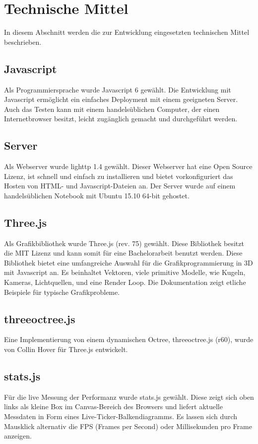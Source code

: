 \documentclass[draft=false
              ,paper=a4
              ,twoside=false
              ,fontsize=11pt
              ,headsepline
              ,BCOR10mm
              ,DIV11
              ,bibtotoc
              ,liststotoc
              ]{scrbook}
\begin{document}
\section{Technische Mittel}
In diesem Abschnitt werden die zur Entwicklung eingesetzten technischen Mittel beschrieben.
\subsection{Javascript}
Als Programmiersprache wurde Javascript 6 gewählt. Die Entwicklung mit Javascript ermöglicht ein einfaches Deployment mit einem geeigneten Server. Auch das Testen kann mit einem handelsüblichen Computer, der einen Internetbrowser besitzt, leicht zugänglich gemacht und durchgeführt werden.
\subsection{Server}
Als Webserver wurde lighttp 1.4 gewählt. Dieser Webserver hat eine Open Source Lizenz, ist schnell und einfach zu installieren und bietet vorkonfiguriert das Hosten von HTML- und Javascript-Dateien an. Der Server wurde auf einem handelsüblichen Notebook mit Ubuntu 15.10 64-bit gehostet.
\subsection{Three.js}
Als Grafikbibliothek wurde Three.js (rev. 75) gewählt. Diese Bibliothek besitzt die MIT Lizenz und kann somit für eine Bachelorarbeit benutzt werden. Diese Bibliothek bietet eine umfangreiche Auswahl für die Grafikprogrammierung in 3D mit Javascript an. Es beinhaltet Vektoren, viele primitive Modelle, wie Kugeln, Kameras, Lichtquellen, und eine Render Loop. Die Dokumentation zeigt etliche Beispiele für typische Grafikprobleme.
\subsection{threeoctree.js}
Eine Implementierung von einem dynamischen Octree, threeoctree.js (r60), wurde von Collin Hover für Three.js entwickelt.
\subsection{stats.js}
Für die live Messung der Performanz wurde stats.js gewählt. Diese zeigt sich oben links als kleine Box im Canvas-Bereich des Browsers und liefert aktuelle Messdaten in Form eines Live-Ticker-Balkendiagramms. Es lassen sich durch Mausklick alternativ die FPS (Frames per Second) oder Millisekunden pro Frame anzeigen.
\end{document}
